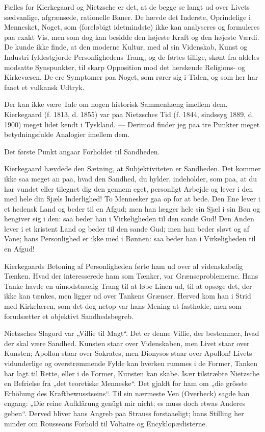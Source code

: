 \documentclass[12pt,a4paper,openany]{book}
\newcommand{\opage}[1]{\marginnote{\footnotesize\textit{[#1]}}}
\begin{document}
Fælles for Kierkegaard og Nietzsche er det, at de begge
se langt ud over Livets sædvanlige, afgrænsede, rationelle Baner.
De hævde det Inderste, Oprindelige i Mennesket, Noget, som
(foreløbigt idetmindste) ikke kan analyseres og formuleres paa
exakt Vis, men som dog kan besidde den højeste Kraft og den
højeste Værdi. De kunde ikke finde, at den moderne Kultur,
med al sin Videnskab, Kunst og Industri fyldestgjorde Personlighedens
Trang, og de førtes tillige, skønt fra aldeles modsatte
Synspunkter, til skarp Opposition mod det herskende Religions- og
Kirkevæsen. De ere Symptomer paa Noget, som rører sig
i Tiden, og som her har faaet et vulkansk Udtryk.

Der kan ikke være Tale om nogen historisk Sammenhæng
imellem dem. Kierkegaard (f. 1813, d. 1855) var paa Nietzsches
Tid (f. 1844, sindssyg 1889, d. 1900) meget lidet kendt i Tyskland.
--- Derimod finder jeg paa tre Punkter meget betydningsfulde
Analogier imellem dem.

Det første Punkt angaar Forholdet til Sandheden.

Kierkegaard hævdede den Sætning, at Subjektiviteten er
Sandheden. Det kommer ikke saa meget an paa, hvad den
Sandhed, du hylder, indeholder, som paa, at du har vundet eller
tilegnet dig den gennem eget, personligt Arbejde og lever i den
\setcounter{footnote}{0}%
\opage{191}med hele din Sjæls Inderlighed! To Mennesker gaa op for at
bede. Den Ene lever i et hedensk Land og beder til en Afgud;
men han lægger hele sin Sjæl i sin Bøn og hengiver sig
i den: saa beder han i Virkeligheden til den sande Gud! Den
Anden lever i et kristent Land og beder til den sande Gud;
men han beder sløvt og af Vane; hans Personlighed er ikke
med i Bønnen: saa beder han i Virkeligheden til en Afgud!

Kierkegaards Betoning af Personligheden førte ham ud over
al videnskabelig Tænken. Hvad der interesserede ham som
Tænker, var Grænseproblemerne. Hans Tanke havde en uimodstaaelig
Trang til at løbe Linen ud, til at opsøge det, der ikke
kan tænkes, men ligger ud over Tankens Grænser. Herved
kom han i Strid med Kirkelæren, som det dog netop var hans
Mening at fastholde, men som forudsætter et objektivt Sandhedsbegreb.


Nietzsches Slagord var „Villie til Magt“. Det er denne
Villie, der bestemmer, hvad der skal være Sandhed. Kunsten
staar over Videnskaben, men Livet staar over Kunsten; Apollon
staar over Sokrates, men Dionysos staar over Apollon! Livets
vidunderlige og overstrømmende Fylde kan hverken rummes i
de Former, Tanken har lagt til Rette, eller i de Former, Kunsten
kan skabe. Især tilstræbte Nietzsche en Befrielse fra „det
teoretiske Menneske“. Det gjaldt for ham om „die grösste
Erhöhung des Kraftbewusstseins“. Til sin nærmeste Ven
(Overbeck) sagde han engang: „Die reine Aufklärung genügt
mir nicht; es muss doch etwas Anderes geben“. Derved bliver
hans Angreb paa Strauss forstaaeligt; hans Stilling her minder
om Rousseaus Forhold til Voltaire og Encyklopædisterne.
\end{document}
